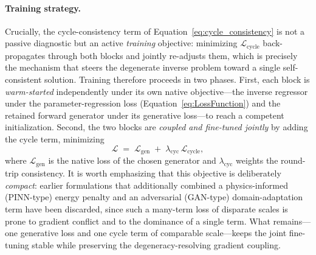 \documentclass[letterpaper, 12, one column]{article}
\begin{document}
\paragraph{Training strategy.}
Crucially, the cycle-consistency term of Equation~\ref{eq:cycle_consistency} is not a passive diagnostic but an active \emph{training} objective: minimizing $\mathcal{L}_{\mathrm{cycle}}$ back-propagates through both blocks and jointly re-adjusts them, which is precisely the mechanism that steers the degenerate inverse problem toward a single self-consistent solution. Training therefore proceeds in two phases. First, each block is \emph{warm-started} independently under its own native objective---the inverse regressor under the parameter-regression loss (Equation~\ref{eq:LossFunction}) and the retained forward generator under its generative loss---to reach a competent initialization. Second, the two blocks are \emph{coupled and fine-tuned jointly} by adding the cycle term, minimizing
\begin{equation}\label{eq:cycle_total}
\mathcal{L} \;=\; \mathcal{L}_{\mathrm{gen}} \;+\; \lambda_{\mathrm{cyc}}\,\mathcal{L}_{\mathrm{cycle}},
\end{equation}
where $\mathcal{L}_{\mathrm{gen}}$ is the native loss of the chosen generator and $\lambda_{\mathrm{cyc}}$ weights the round-trip consistency. It is worth emphasizing that this objective is deliberately \emph{compact}: earlier formulations that additionally combined a physics-informed (PINN-type) energy penalty and an adversarial (GAN-type) domain-adaptation term have been discarded, since such a many-term loss of disparate scales is prone to gradient conflict and to the dominance of a single term. What remains---one generative loss and one cycle term of comparable scale---keeps the joint fine-tuning stable while preserving the degeneracy-resolving gradient coupling.
\end{document}
